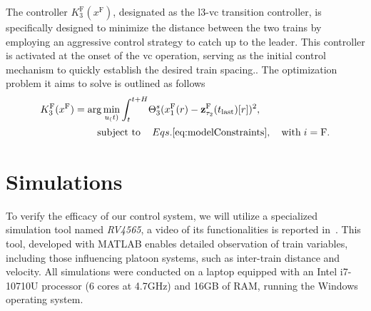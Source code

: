 \documentclass[letterpaper, 10 pt, conference]{ieeeconf}
\theoremstyle{definition}
\theoremstyle{nopoint}
\newcommand{\tildeAdd}{~}
\begin{document}
The controller $K^{\mathrm{F}}_3(x^{\mathrm{F}})$, designated as the \gls{l3}-\gls{vc} transition controller, is specifically designed to minimize the distance between the two trains by employing an aggressive control strategy to catch up to the leader. This controller is activated at the onset of the \gls{vc} operation, serving as the initial control mechanism to quickly establish the desired train spacing.. The optimization problem it aims to solve is outlined as follows
%
\begin{equation}
	\label{eq:K_3_controller}
	\begin{aligned}
		K^{\mathrm{F}}_3(x^\mathrm{F}) = \arg  \min_{u_(t)} \int_{t}^{t+H}& \Theta^s_3(x_1^{\mathrm{F}}(r)-\mathbf{z}_{\tau_2}^\mathrm{F}(t_{\mathrm{last}})[r])^2, \\
		&	\hspace{-1.8cm} \text{subject to} \qquad \hspace{-1cm}  \qquad Eqs.\eqref{eq:modelConstraints}, \quad \mathrm{with} \; i = \mathrm{F}.
	\end{aligned}
\end{equation}






 
\section{Simulations}
 \label{sec:Simulations}
 
  To verify the efficacy of our control system, we will utilize a specialized simulation tool named \textit{RV4565}, a video of its functionalities is reported in\tildeAdd\cite{videoYoutube}. This tool, developed with MATLAB enables detailed observation of train variables, including those influencing platoon systems, such as inter-train distance and velocity. All simulations were conducted on a laptop equipped with an Intel i7-10710U processor (6 cores at 4.7GHz) and 16GB of RAM, running the Windows operating system.
  
\end{document}
